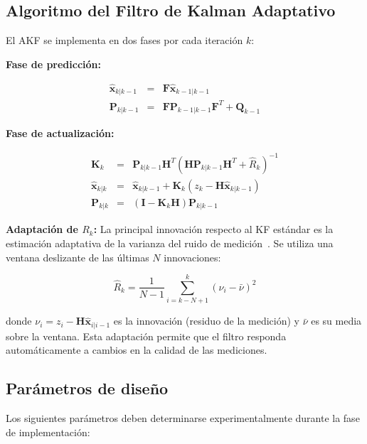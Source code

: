 \subsection{Algoritmo del Filtro de Kalman Adaptativo}
\label{sec:2.3.3}

El AKF se implementa en dos fases por cada iteración $k$:

\textbf{Fase de predicción:}

\begin{eqnarray}
\hat{\mathbf{x}}_{k|k-1} &=& \mathbf{F} \hat{\mathbf{x}}_{k-1|k-1} \\
\mathbf{P}_{k|k-1} &=& \mathbf{F} \mathbf{P}_{k-1|k-1} \mathbf{F}^T + \mathbf{Q}_{k-1}
\end{eqnarray}

\textbf{Fase de actualización:}

\begin{eqnarray}
\mathbf{K}_k &=& \mathbf{P}_{k|k-1} \mathbf{H}^T (\mathbf{H} \mathbf{P}_{k|k-1} \mathbf{H}^T + \hat{R}_k)^{-1} \\
\hat{\mathbf{x}}_{k|k} &=& \hat{\mathbf{x}}_{k|k-1} + \mathbf{K}_k (z_k - \mathbf{H} \hat{\mathbf{x}}_{k|k-1}) \\
\mathbf{P}_{k|k} &=& (\mathbf{I} - \mathbf{K}_k \mathbf{H}) \mathbf{P}_{k|k-1}
\end{eqnarray}

\textbf{Adaptación de $R_k$:} La principal innovación respecto al KF estándar es la estimación adaptativa de la varianza del ruido de medición~\cite{hollosi2024}. Se utiliza una ventana deslizante de las últimas $N$ innovaciones:

\begin{equation}
\hat{R}_k = \frac{1}{N-1} \sum_{i=k-N+1}^{k} (\nu_i - \bar{\nu})^2
\end{equation}

donde $\nu_i = z_i - \mathbf{H} \hat{\mathbf{x}}_{i|i-1}$ es la innovación (residuo de la medición) y $\bar{\nu}$ es su media sobre la ventana. Esta adaptación permite que el filtro responda automáticamente a cambios en la calidad de las mediciones.

\subsection{Parámetros de diseño}
\label{sec:2.3.4}

Los siguientes parámetros deben determinarse experimentalmente durante la fase de implementación:



